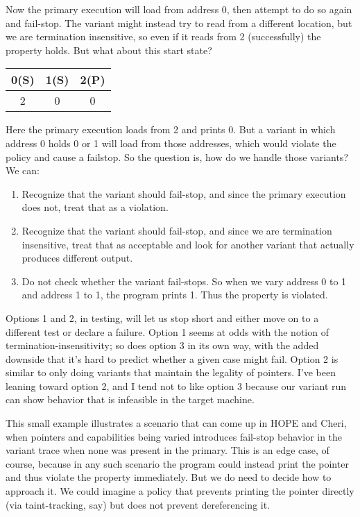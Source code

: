 \documentclass{article}
\begin{document}
Now the primary execution will load from address 0, then attempt to do so again and fail-stop. The variant
might instead try to read from a different location, but we are termination insensitive, so even if it reads
from 2 (successfully) the property holds. But what about this start state?

\begin{tabular}{| c | c | c |}
  \hline
  0(S) & 1(S) & 2(P) \\
  \hline
  2 & 0 & 0 \\
  \hline
\end{tabular}

Here the primary execution loads from 2 and prints 0. But a variant in which address 0 holds 0 or 1 will
load from those addresses, which would violate the policy and cause a failstop. So the question is, how do
we handle those variants? We can:

\begin{enumerate}
\item Recognize that the variant should fail-stop, and since the primary execution does not,
  treat that as a violation.
\item Recognize that the variant should fail-stop, and since we are termination insensitive,
  treat that as acceptable and look for another variant that actually produces different output.
\item Do not check whether the variant fail-stops. So when we vary address 0 to 1 and address 1 to 1,
  the program prints 1. Thus the property is violated.
\end{enumerate}

Options 1 and 2, in testing, will let us stop short and either move on to a different test or
declare a failure. Option 1 seems at odds with the notion of termination-insensitivity; so does option 3
in its own way, with the added downside that it's hard to predict whether a given case might fail. Option
2 is similar to only doing variants that maintain the legality of pointers. I've been leaning toward option
2, and I tend not to like option 3 because our variant run can show behavior that is infeasible in the
target machine.

This small example illustrates a scenario that can come up in HOPE and Cheri, when pointers and capabilities
being varied introduces fail-stop behavior in the variant trace when none was present in the primary. This
is an edge case, of course, because in any such scenario the program could instead print the pointer and thus
violate the property immediately. But we do need to decide how to approach it. We could imagine a policy that
prevents printing the pointer directly (via taint-tracking, say) but does not prevent dereferencing it.
\end{document}
